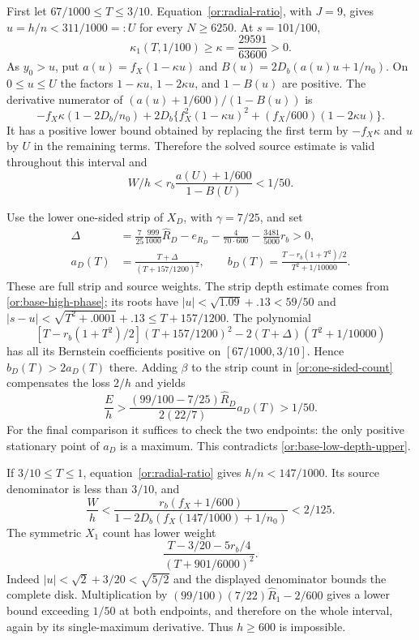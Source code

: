 \documentclass[11pt,reqno]{amsart}
\numberwithin{equation}{section}
\theoremstyle{definition}
\theoremstyle{remark}
\begin{document}
First let $67/1000\le T\le3/10$.  Equation~\eqref{or:radial-ratio},
with $J=9$, gives $u=h/n<311/1000=:U$ for
every $N\ge6250$.  At $s=101/100$,
\[
       \kappa_1(T,1/100)\ge\kappa=\frac{29591}{63600}>0.
\]
As $y_0>u$, put $a(u)=f_X(1-\kappa u)$ and
$B(u)=2D_b(a(u)u+1/n_0)$.  On $0\le u\le U$ the factors
$1-\kappa u$, $1-2\kappa u$, and $1-B(u)$ are positive.
The derivative numerator of
$(a(u)+1/600)/(1-B(u))$ is
\[
 -f_X\kappa(1-2D_b/n_0)
 +2D_b\{f_X^2(1-\kappa u)^2+(f_X/600)(1-2\kappa u)\}.
\]
It has a positive lower bound obtained by replacing the first term
by $-f_X\kappa$ and $u$ by $U$ in the remaining terms.
Therefore the solved source estimate is valid throughout this
interval and
\begin{equation}\label{or:base-low-depth-upper}
                  W/h<r_b\frac{a(U)+1/600}{1-B(U)}<1/50.
\end{equation}

Use the lower one-sided strip of $X_D$, with $\gamma=7/25$, and set
\[
 \begin{split}
 \Delta&=\frac7{25}\frac{999}{1000}\widehat R_D-e_{R_D}
          -\frac4{70\cdot600}-\frac{3481}{5000}r_b>0,\\
 a_D(T)&=\frac{T+\Delta}{(T+157/1200)^2},\qquad
 b_D(T)=\frac{T-r_b(1+T^2)/2}{T^2+1/10000}.
 \end{split}
\]
These are full strip and source weights.  The strip depth estimate
comes from \eqref{or:base-high-phase}; its roots have
$|u|<\sqrt{1.09}+.13<59/50$ and
$|s-u|<\sqrt{T^2+.0001}+.13\le T+157/1200$.
The polynomial
\[
 [T-r_b(1+T^2)/2](T+157/1200)^2
             -2(T+\Delta)(T^2+1/10000)
\]
has all its Bernstein coefficients positive on
$[67/1000,3/10]$.  Hence $b_D(T)>2a_D(T)$ there.
Adding $\beta$ to the strip count in \eqref{or:one-sided-count}
compensates the loss $2/h$ and yields
\[
 \frac Eh>\frac{(99/100-7/25)\widehat R_D}{2(22/7)}a_D(T)>1/50.
\]
For the final comparison it suffices to check the two endpoints:
the only positive stationary point of $a_D$ is a maximum.
This contradicts \eqref{or:base-low-depth-upper}.

If $3/10\le T\le1$, equation~\eqref{or:radial-ratio} gives
$h/n<147/1000$.  Its source denominator is less than $3/10$, and
\[
 \frac Wh<
 \frac{r_b(f_X+1/600)}{1-2D_b(f_X(147/1000)+1/n_0)}<2/125.
\]
The symmetric $X_1$ count has lower weight
\[
       \frac{T-3/20-5r_b/4}{(T+901/6000)^2}.
\]
Indeed $|u|<\sqrt2+3/20<\sqrt{5/2}$ and the displayed denominator
bounds the complete disk.  Multiplication by
$(99/100)(7/22)\widehat R_1-2/600$ gives a lower bound exceeding
$1/50$ at both endpoints, and therefore on the whole interval, again
by its single-maximum derivative.  Thus $h\ge600$ is impossible.
\end{document}
